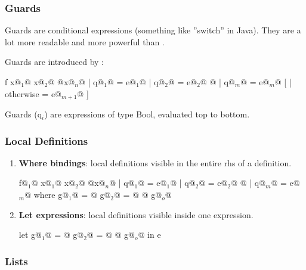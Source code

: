 \subsubsection{Guards}
Guards are conditional expressions (something like ''switch'' in Java).
They are a lot more readable and more powerful than .

Guards are introduced by \codeline{|}:\\
\begin{Haskell}
f x@$_1$@ x@$_2$@ @\dots@ x@$_n$@
  | q@$_1$@     = e@$_1$@
  | q@$_2$@     = e@$_2$@
  @\dots@
  | q@$_m$@     = e@$_m$@
[ | otherwise   = e@$_{m+1}$@ ]
\end{Haskell}

Guards (q$_i$) are expressions of type Bool, evaluated top to bottom.


\subsubsection{Local Definitions}

\begin{enumerate}
  \item \textbf{Where bindings}: local definitions visible in the entire rhs of a definition.\\
  \begin{Haskell}
f@$_1$@ x@$_1$@ x@$_2$@ @\dots@ x@$_n$@ | q@$_1$@ = e@$_1$@
                    | q@$_2$@ = e@$_2$@ 
                    @\dots@
                    | q@$_m$@ = e@$_m$@ 
	where 
		g@$_1$@ = @\dots@
		g@$_2$@ = @\dots@
		@\dots@
		g@$_o$@
  \end{Haskell}


  \item \textbf{Let expressions}: local definitions visible inside one expression.\\
  \begin{Haskell}
let g@$_1$@ = @\dots@
    g@$_2$@ = @\dots@
    @\dots@
    g@$_o$@
in e
  \end{Haskell}
\end{enumerate}

\subsubsection{Lists}

